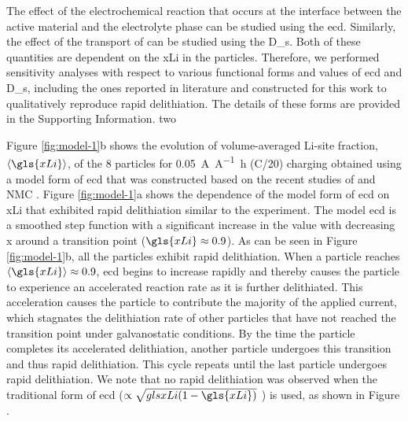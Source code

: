 \documentclass{article}
\begin{document}
The effect of the electrochemical reaction that occurs at the
interface between the active material and the electrolyte phase can be
studied using the \gls{ecd}. Similarly, the effect of the transport of
 can be studied using the \gls{D_s}. Both of these quantities
are dependent on the \gls{xLi} in the particles. Therefore, we
performed sensitivity analyses with respect to various functional
forms and values of \gls{ecd} and \gls{D_s}, including the ones
reported in literature and constructed for this work to qualitatively
reproduce rapid delithiation. The details of these forms are provided
in the Supporting Information. %
two

Figure \ref{fig:model-1}b shows the evolution of volume-averaged
Li-site fraction, $\left\langle \gls{xLi} \right\rangle$, of the 8
particles for \SI{0.05}{\ampere\per\ampere\hour} (C/20) charging
obtained using a model form of \gls{ecd} that was constructed based on
the recent studies of \nca{} \cite{chueh2021} and NMC \cite{tsai2018,
  mukherjee2017, chiang2020}. Figure \ref{fig:model-1}a shows the
dependence of the model form of \gls{ecd} on \gls{xLi} that exhibited
rapid delithiation similar to the experiment. The model \gls{ecd} is a
smoothed step function with a significant increase in the value with
decreasing x around a transition point ($\gls{xLi}\approx0.9$). As can
be seen in Figure \ref{fig:model-1}b, all the particles exhibit rapid
delithiation. When a particle reaches $\left\langle \gls{xLi}
\right\rangle\approx0.9$, \gls{ecd} begins to increase rapidly and
thereby causes the particle to experience an accelerated reaction rate
as it is further delithiated. This acceleration causes the particle to
contribute the majority of the applied current, which stagnates the
delithiation rate of other particles that have not reached the
transition point under galvanostatic conditions. By the time the
particle completes its accelerated delithiation, another particle
undergoes this transition and thus rapid delithiation. This cycle
repeats until the last particle undergoes rapid delithiation.  We note
that no rapid delithiation was observed when the traditional form of
\gls{ecd} ($\propto\sqrt{gls{xLi}(1-\gls{xLi})}$ \cite{newman1993,
  newman1994, newman1995, newman1996}) is used, as shown in Figure
.
\end{document}

